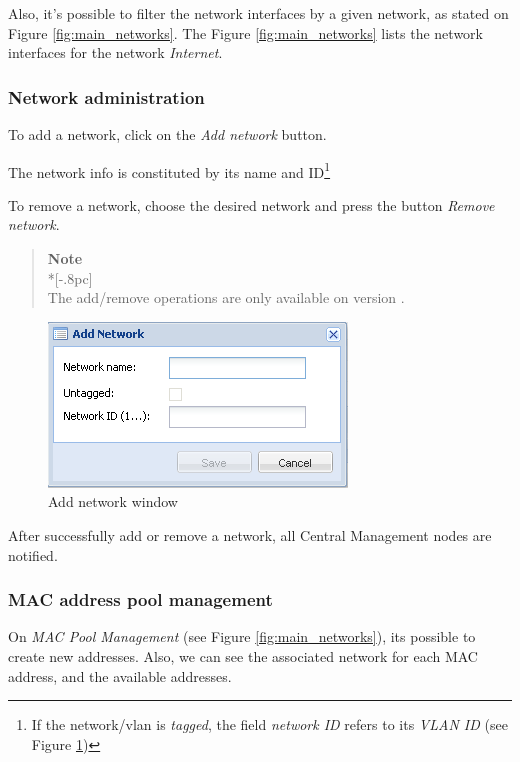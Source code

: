 Also, it's possible to filter the network interfaces by a given network, as stated on Figure \ref{fig:main_networks}.
The Figure \ref{fig:main_networks} lists the network interfaces for the network \emph{Internet}.

\subsubsection{Network administration}

To add a network, click on the \emph{Add network} button.

The network info is constituted by its name and ID\footnote{If the network/vlan is \emph{tagged}, the field \emph{network ID} refers to its \emph{VLAN ID} (see Figure \ref{fig:network_create})}

To remove a network, choose the desired network and press the button \emph{Remove network}. 

\begin{quote}
	{\large \bf Note} \\*[-.8pc]
	\underline{\hspace{6in}} \\
    The add/remove operations are only available on version \acronym.
\end{quote}


\begin{figure}[H]
	\begin{center}
	\includegraphics[scale=0.5]{screenshots/network_create.png}
	\caption{Add network window}
	\label{fig:network_create}
	\end{center}
\end{figure}

After successfully add or remove a network, all Central Management nodes are notified.

\subsubsection{MAC address pool management}
\label{sec:mac_pool}

On \emph{MAC Pool Management} (see Figure \ref{fig:main_networks}), its possible to create new addresses.
Also, we can see the associated network for each MAC address, and the available addresses.

